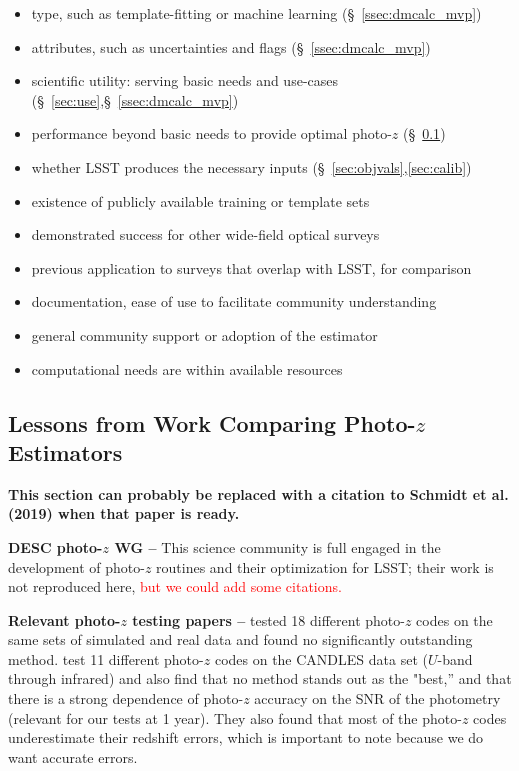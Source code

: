 \documentclass[DM,lsstdraft,toc]{lsstdoc}
\begin{document}
\begin{itemize}
\item type, such as template-fitting or machine learning (\S~\ref{ssec:dmcalc_mvp})
\item attributes, such as uncertainties and flags (\S~\ref{ssec:dmcalc_mvp})
\item scientific utility: serving basic needs and use-cases (\S~\ref{sec:use},\S~\ref{ssec:dmcalc_mvp})
\item performance beyond basic needs to provide optimal photo-$z$ (\S~\ref{ssec:sel_lit})
\item whether LSST produces the necessary inputs (\S~\ref{sec:objvals},\ref{sec:calib})
\item existence of publicly available training or template sets
\item demonstrated success for other wide-field optical surveys
\item previous application to surveys that overlap with LSST, for comparison
\item documentation, ease of use to facilitate community understanding
\item general community support or adoption of the estimator
\item computational needs are within available resources
\end{itemize}

\subsection{Lessons from Work Comparing Photo-$z$ Estimators}\label{ssec:sel_lit}

{\bf This section can probably be replaced with a citation to Schmidt et al. (2019) when that paper is ready.}

\textbf{DESC photo-$z$ WG --} This science community is full engaged in the development of photo-$z$ routines and their optimization for LSST; their work is not reproduced here, \textcolor{red}{but we could add some citations.}

\textbf{Relevant photo-$z$ testing papers --} \cite{2010A&A...523A..31H} tested 18 different photo-$z$ codes on the same sets of simulated and real data and found no significantly outstanding method. \cite{2013ApJ...775...93D} test 11 different photo-$z$ codes on the CANDLES data set ($U$-band through infrared) and also find that no method stands out as the "best,'' and that there is a strong dependence of photo-$z$ accuracy on the SNR of the photometry (relevant for our tests at 1 year). They also found that most of the photo-$z$ codes underestimate their redshift errors, which is important to note because we do want accurate errors.
\end{document}
